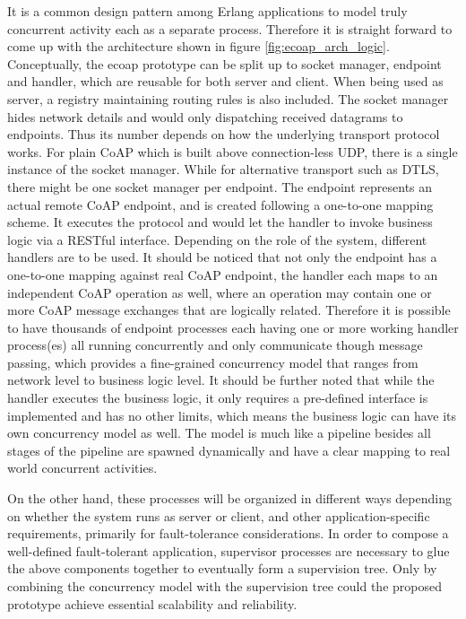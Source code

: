 It is a common design pattern among Erlang applications to model truly concurrent activity each as a separate process. Therefore it is straight forward to come up with the architecture shown in figure \ref{fig:ecoap_arch_logic}. Conceptually, the ecoap prototype can be split up to socket manager, endpoint and handler, which are reusable for both server and client. When being used as server, a registry maintaining routing rules is also included. The socket manager hides network details and would only dispatching received datagrams to endpoints. Thus its number depends on how the underlying transport protocol works. For plain CoAP which is built above connection-less UDP, there is a single instance of the socket manager. While for alternative transport such as DTLS, there might be one socket manager per endpoint. The endpoint represents an actual remote CoAP endpoint, and is created following a one-to-one mapping scheme. It executes the protocol and would let the handler to invoke business logic via a RESTful interface. Depending on the role of the system, different handlers are to be used. It should be noticed that not only the endpoint has a one-to-one mapping against real CoAP endpoint, the handler each maps to an independent CoAP operation as well, where an operation may contain one or more CoAP message exchanges that are logically related. Therefore it is possible to have thousands of endpoint processes each having one or more working handler process(es) all running concurrently and only communicate though message passing, which provides a fine-grained concurrency model that ranges from network level to business logic level. It should be further noted that while the handler executes the business logic, it only requires a pre-defined interface is implemented and has no other limits, which means the business logic can have its own concurrency model as well. The model is much like a pipeline besides all stages of the pipeline are spawned dynamically and have a clear mapping to real world concurrent activities. 
 
On the other hand, these processes will be organized in different ways depending on whether the system runs as server or client, and other application-specific requirements, primarily for fault-tolerance considerations. In order to compose a well-defined fault-tolerant application, supervisor processes are necessary to glue the above components together to eventually form a supervision tree. Only by combining the concurrency model with the supervision tree could the proposed prototype achieve essential scalability and reliability. 

